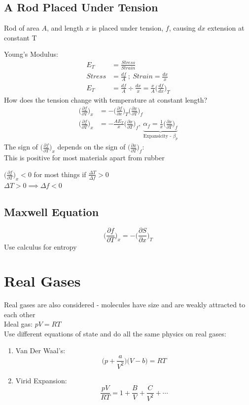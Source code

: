 \documentclass[a4paper, 11pt, normalem]{report}
\newcommand\p{\partial}
\begin{document}
\subsection{A Rod Placed Under Tension}
Rod of area $A$, and length $x$ is placed under tension, $f$, causing $dx$ extension at constant T

Young's Modulus:
\begin{align*}
    E_T &= \frac{Stress}{Strain} \\
    Stress &= \frac{df}{A} ~;~ Strain = \frac{dx}{x} \\
    E_T &= \frac{df}{A} \div \frac{dx}{x} = \frac{x}{A} \Big(\frac{df}{dx}\Big)_T
\end{align*}
How does the tension change with temperature at constant length?
\begin{align*}
    \Big(\frac{\p f}{\p T}\Big)_x &= -\Big(\frac{\p f}{\p x}\Big)_T \Big(\frac{\p x}{\p T}\Big)_f \\
    \Big(\frac{\p f}{\p T}\Big)_x &= -\frac{AE_T}{x}\Big(\frac{\p x}{\p T}\Big)_f,~ \underbrace{\alpha_f = \frac{1}{x}\Big(\frac{\p x}{\p T}\Big)_f}_{\text{Expansicity - }\beta_p}
\end{align*}
The sign of $\Big(\frac{\p f}{\p T}\Big)_x$ depends on the sign of $\Big(\frac{\p x}{\p T}\Big)_f$: \\
This is positive for most materials apart from rubber

$\Big(\frac{\p f}{\p T}\Big)_x < 0$ for most things if $\frac{\Delta T}{\Delta f} > 0$ \\
$\Delta T > 0 \implies \Delta f < 0$

\subsection{Maxwell Equation}
\begin{equation*}
    \Big(\frac{\p f}{\p T}\Big)_x = -\Big(\frac{\p S}{\p x}\Big)_T
\end{equation*}
Use calculus for entropy

\section{Real Gases}
Real gases are also considered - molecules have size and are weakly attracted to each other \\
Ideal gas: $pV = RT$ \\
Use different equations of state and do all the same physics on real gases:
\begin{enumerate}
    \item Van Der Waal's:
            \begin{equation*}
                \Big(p + \frac{a}{V^2}\Big)\Big(V - b\Big) = RT
            \end{equation*}
    \item Virid Expansion:
            \begin{equation*}
                \frac{pV}{RT} = 1 + \frac{B}{V} + \frac{C}{V^2} + \cdots
            \end{equation*}
\end{enumerate}
\end{document}
